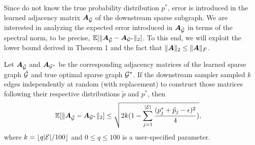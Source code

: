 Since \sgs do not know the true probability distribution $p^*$, error is introduced in the learned adjacency matrix ${\bm{A}}_{\tilde{{\mathcal{G}}}}$ of the downstream sparse subgraph. We are interested in analyzing the expected error introduced in ${\bm{A}}_{\tilde{{\mathcal{G}}}}$ in terms of the spectral norm, to be precise, $\mathbb{E}[\|{\bm{A}}_{\tilde{{\mathcal{G}}}} - {\bm{A}}_{{\mathcal{G}}^*}\|_2]$. To this end, we will exploit the lower bound derived in Theorem 1 and the fact that $\|{\bm{A}}\|_2 \leq \|{\bm{A}}\|_F$. 

\begin{lemma} Let ${\bm{A}}_{\tilde{{\mathcal{G}}}}$ and ${\bm{A}}_{{\mathcal{G}}^*}$ be the corresponding adjacency matrices of the learned sparse graph $\tilde{{\mathcal{G}}}$ and true optimal sparse graph ${\mathcal{G}}^*$. If the downstream sampler sampled $k$ edges independently at random (with replacement) to construct those matrices following their respective distributions $\tilde{p}$ and $p^*$, then 
    \[
    \mathbb{E}[\|{\bm{A}}_{\tilde{{\mathcal{G}}}} - {\bm{A}}_{{\mathcal{G}}^*}\|_2] \leq \sqrt{2k(1-\sum_{j=1}^{\lvert\mathcal{E}\rvert} \frac{(p^*_j + \tilde{p}_j - \epsilon)^2}{4})},
    \]
    where $k = \lfloor q|\mathcal{E}|/100 \rfloor$ and $0 \leq q \leq 100$ is a user-specified parameter.
\end{lemma}
